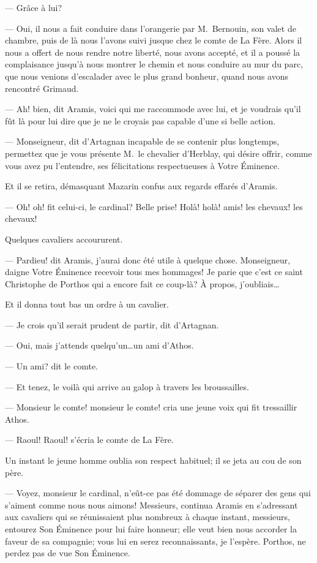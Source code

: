 — Grâce à lui?

— Oui, il nous a fait conduire dans l'orangerie par M.~Bernouin, son valet de chambre, puis de là nous l'avons suivi jusque chez le comte de La Fère. Alors il nous a offert de nous rendre notre liberté, nous avons accepté, et il a poussé la complaisance jusqu'à nous montrer le chemin et nous conduire au mur du parc, que nous venions d'escalader avec le plus grand bonheur, quand nous avons rencontré Grimaud.

— Ah! bien, dit Aramis, voici qui me raccommode avec lui, et je voudrais qu'il fût là pour lui dire que je ne le croyais pas capable d'une si belle action.

— Monseigneur, dit d'Artagnan incapable de se contenir plus longtemps, permettez que je vous présente M.~le chevalier d'Herblay, qui désire offrir, comme vous avez pu l'entendre, ses félicitations respectueuses à Votre Éminence.

Et il se retira, démasquant Mazarin confus aux regards effarés d'Aramis.

— Oh! oh! fit celui-ci, le cardinal? Belle prise! Holà! holà! amis! les chevaux! les chevaux!

Quelques cavaliers accoururent.

— Pardieu! dit Aramis, j'aurai donc été utile à quelque chose. Monseigneur, daigne Votre Éminence recevoir tous mes hommages! Je parie que c'est ce saint Christophe de Porthos qui a encore fait ce coup-là? À propos, j'oubliais\dots

Et il donna tout bas un ordre à un cavalier.

— Je crois qu'il serait prudent de partir, dit d'Artagnan.

— Oui, mais j'attends quelqu'un\dots un ami d'Athos.

— Un ami? dit le comte.

— Et tenez, le voilà qui arrive au galop à travers les broussailles.

— Monsieur le comte! monsieur le comte! cria une jeune voix qui fit tressaillir Athos.

— Raoul! Raoul! s'écria le comte de La Fère.

Un instant le jeune homme oublia son respect habituel; il se jeta au cou de son père.

— Voyez, monsieur le cardinal, n'eût-ce pas été dommage de séparer des gens qui s'aiment comme nous nous aimons! Messieurs, continua Aramis en s'adressant aux cavaliers qui se réunissaient plus nombreux à chaque instant, messieurs, entourez Son Éminence pour lui faire honneur; elle veut bien nous accorder la faveur de sa compagnie; vous lui en serez reconnaissants, je l'espère. Porthos, ne perdez pas de vue Son Éminence.

